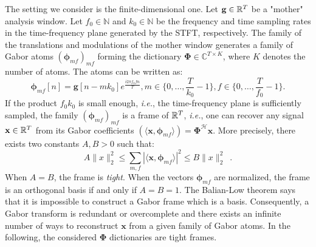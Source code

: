 The setting we consider is the finite-dimensional one. Let $\mathbf{g}\in \mathbb{R}^{T}$ be a "mother" analysis window. Let $f_0\in \mathbb{N}$ and $k_0\in \mathbb{N}$ be the frequency and time sampling rates in the time-frequency plane generated by the STFT, respectively. The family of the translations and modulations of the mother window generates a family of Gabor atoms $(\mathbf{\phi}_{mf})_{mf}$ forming the dictionary $\mathbf{\Phi}\in \mathbb{C}^{T\times K}$, where $K$ denotes the number of atoms. The atoms can be written as:
\begin{equation} \label{eq_gabor_atoms}
	\mathbf{\phi}_{mf}[n] = \mathbf{g}[n-mk_0]e^{\frac{i2\pi f_0 fn}{T}}, m\in \{0,\dots ,\frac{T}{k_0}-1\}, f\in \{0,\dots ,\frac{T}{f_0}-1\}.
\end{equation}
If the product $f_0k_0$ is small enough, \textit{i.e.}, the time-frequency plane is sufficiently sampled, the family $(\mathbf{\phi}_{mf})_{mf}$ is a frame of $\mathbb{R}^T$, \textit{i.e.}, one can recover any signal $\mathbf{x}\in \mathbb{R}^T$ from its Gabor coefficients $(\langle \mathbf{x}, \mathbf{\phi}_{mf}\rangle)=\mathbf{\Phi}^{\mathcal{H}}\mathbf{x}$. More precisely, there exists two constants $A, B > 0$ such that:
\begin{equation} \label{eq_frame}
	A\|x\|_2^2 \leq \sum_{m,f}|\langle \mathbf{x}, \mathbf{\phi}_{mf}\rangle|^2\leq B\|x\|_2^2 \enspace .
\end{equation}
When $A=B$, the frame is \textit{tight}. When the vectors $\mathbf{\phi}_{mf}$ are normalized, the frame is an orthogonal basis if and only if $A=B=1$. The Balian-Low theorem says that it is impossible to construct a Gabor frame which is a basis. Consequently, a Gabor transform is redundant or overcomplete and there exists an infinite number of ways to reconstruct $\mathbf{x}$ from a given family of Gabor atoms. In the following, the considered $\mathbf{\Phi}$ dictionaries are tight frames.

